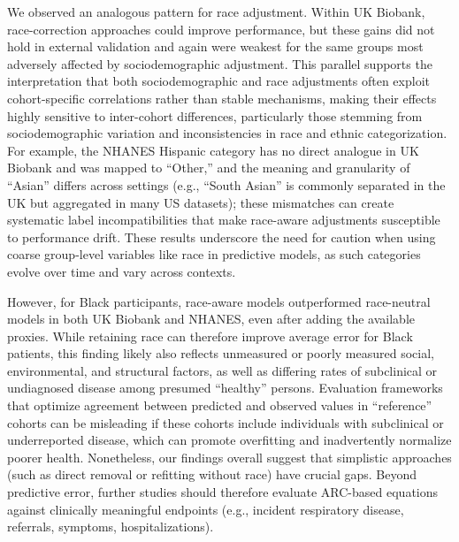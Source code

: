 \documentclass[10pt]{extarticle}
\begin{document}
We observed an analogous pattern for race adjustment. Within UK Biobank, race-correction approaches could improve performance, but these gains did not hold in external validation and again were weakest for the same groups most adversely affected by sociodemographic adjustment. This parallel supports the interpretation that both sociodemographic and race adjustments often exploit cohort-specific correlations rather than stable mechanisms, making their effects highly sensitive to inter-cohort differences, particularly those stemming from sociodemographic variation\cite{Movva2023-wg,Zhang2022-nr,Singh2021-tx} and inconsistencies in race and ethnic categorization\cite{Frey2018-xs,Gardner1985-xj,Goh2021-wx,Parker2015-me,Venkataramani2025-of}. For example, the NHANES Hispanic category has no direct analogue in UK Biobank and was mapped to ``Other,'' and the meaning and granularity of ``Asian'' differs across settings (e.g., ``South Asian'' is commonly separated in the UK but aggregated in many US datasets); these mismatches can create systematic label incompatibilities that make race-aware adjustments susceptible to performance drift. These results underscore the need for caution when using coarse group-level variables like race in predictive models, as such categories evolve over time and vary across contexts\cite{Noe-Bustamante2021-ko,Parker2015-me}.

However, for Black participants, race-aware models outperformed race-neutral models in both UK Biobank and NHANES, even after adding the available proxies. While retaining race can therefore improve average error for Black patients, this finding likely also reflects unmeasured or poorly measured social, environmental, and structural factors, as well as differing rates of subclinical or undiagnosed disease among presumed ``healthy'' persons. Evaluation frameworks that optimize agreement between predicted and observed values in ``reference'' cohorts can be misleading if these cohorts include individuals with subclinical or underreported disease, which can promote overfitting and inadvertently normalize poorer health. Nonetheless, our findings overall suggest that simplistic approaches (such as direct removal or refitting without race) have crucial gaps. Beyond predictive error, further studies should therefore evaluate ARC-based equations against clinically meaningful endpoints (e.g., incident respiratory disease, referrals, symptoms, hospitalizations).
\end{document}
